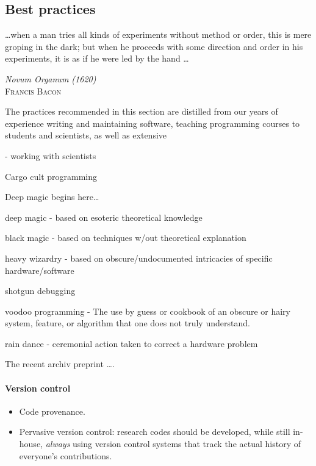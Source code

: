 \documentclass[ChapterTOCs,krantz2]{krantz} %
\begin{document}
\subsection{Best practices}

\setlength{\epigraphrule}{0pt}
\setlength{\epigraphwidth}{.65\textwidth}
\epigraph%
{%
  \ldots when a man tries all kinds of experiments without method or
  order, this is mere groping in the dark; but when he proceeds with
  some direction and order in his experiments, it is as if he were
  led by the hand \ldots
}%
{\textit{Novum Organum (1620)}\\ \textsc{Francis Bacon} }

The practices recommended in this section are distilled
from our years of experience writing and maintaining software,
teaching programming courses to students and scientists, as well
as extensive 

- working with scientists

Cargo cult programming

Deep magic begins here\ldots

  deep magic - based on esoteric theoretical knowledge
  
  black magic - based on techniques w/out theoretical explanation
  
  heavy wizardry - based on obscure/undocumented intricacies of specific 
                  hardware/software
  
  shotgun debugging
  
  voodoo programming -  The use by guess or cookbook of an
  obscure or hairy system, feature, or algorithm that one does not truly
  understand.

  rain dance - ceremonial action taken to correct a hardware problem

The recent archiv preprint \ldots \cite{2012arXiv1210.0530A}.
\paragraph{ {\bf Version control}}

\begin{itemize}

\item Code provenance.

\item Pervasive version control: research codes should be developed, while
still in-house, \emph{always} using version control systems that track
the actual history of everyone's contributions.

\end{itemize}
\end{document}
